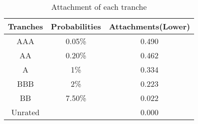 \begin{table}[ht]
\centering
\begin{tabular}{@{}ccc@{}}
\toprule
Tranches & Probabilities & Attachments(Lower) \\ \midrule
AAA      & 0.05\%        & 0.490              \\
AA       & 0.20\%        & 0.462              \\
A        & 1\%           & 0.334              \\
BBB      & 2\%           & 0.223              \\
BB       & 7.50\%        & 0.022              \\
Unrated  &               & 0.000              \\ \bottomrule
\end{tabular}
\caption{Attachment of each tranche}
\label{tab:prob2-attachment}
\end{table}

